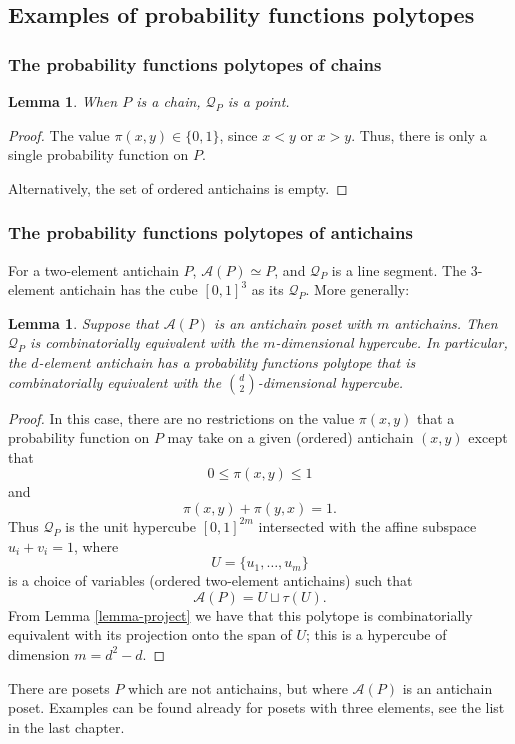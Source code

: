 \documentclass[11pt,a4paper,abstract=yes]{scrartcl}
\theoremstyle{plain}
\newtheorem{lemma}[theorem]{Lemma}
\newcommand{\prpolytope}[1]{\mathcal{Q}_{#1}}
\newcommand{\twoanti}[1]{\mathcal{A}({#1})}
\begin{document}
\subsection{Examples of probability functions polytopes}
\label{sec:org2c2b1aa}
\subsubsection{The probability functions polytopes of chains}
\label{sec:org8b78ebb}
\begin{lemma}
When \(P\) is a chain, \(\prpolytope{P}\) is a point.
\end{lemma}
\begin{proof}
The value \(\pi(x,y) \in \{0,1\}\), since \(x < y\) or \(x > y\). Thus, there is only a single
probability function on \(P\).

Alternatively, the set of ordered antichains is empty.
\end{proof}
\subsubsection{The probability functions polytopes of antichains}
\label{sec:orgcd61984}
For a two-element antichain \(P\), \(\twoanti{P} \simeq P\),
and \(\prpolytope{P}\) is a line segment.
The 3-element antichain has the cube \([0,1]^{3}\) as its \(\prpolytope{P}\).
More generally:
\begin{lemma}
Suppose that \(\twoanti{P}\) is an antichain poset with \(m\) antichains.
Then \(\prpolytope{P}\) is combinatorially equivalent with the \(m\)-dimensional hypercube.
In particular, the \(d\)-element antichain has a  probability functions polytope that is combinatorially equivalent with the
\({\binom{d}{2}}\)-dimensional hypercube.
\end{lemma}
\begin{proof}
In this case,
there are no restrictions on the value \(\pi(x,y)\) that a probability function
on \(P\) may take on a given (ordered) antichain \((x,y)\) except that
\[0 \le \pi(x,y) \le 1\] and
\[\pi(x,y) + \pi(y,x)=1.\]
Thus \(\prpolytope{P}\) is the unit hypercube \([0,1]^{2m}\)
intersected with the affine subspace \(u_{i} + v_{i}=1\), where
\[U=\{u_{1},\dots,u_{m}\}\]
is a choice of variables (ordered two-element antichains) such that
\[\twoanti{P} = U \sqcup \tau(U).\]
From Lemma \ref{lemma-project} we have that this polytope is combinatorially equivalent with its projection
onto the span of \(U\); this is a hypercube of dimension \(m = d^{2}-d\).
\end{proof}
There are posets \(P\) which are not antichains, but where
\(\twoanti{P}\) is an antichain poset. Examples can be found already for posets with three elements,
see the list in the last chapter.
\end{document}
